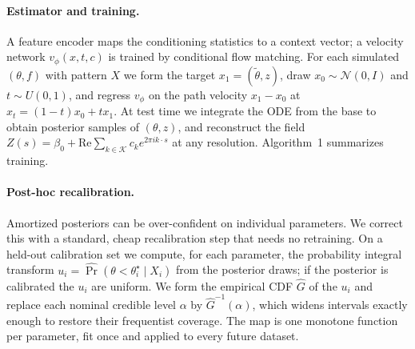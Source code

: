 \documentclass[10pt,twocolumn]{article}
\begin{document}
\paragraph{Estimator and training.}
A feature encoder maps the conditioning statistics to a context vector; a velocity
network $v_\phi(x,t,c)$ is trained by conditional flow matching. For each simulated
$(\theta,f)$ with pattern $X$ we form the target $x_1=(\tilde\theta,z)$, draw
$x_0\sim\mathcal{N}(0,I)$ and $t\sim U(0,1)$, and regress $v_\phi$ on the path
velocity $x_1-x_0$ at $x_t=(1-t)x_0+t x_1$. At test time we integrate the ODE from
the base to obtain posterior samples of $(\theta,z)$, and reconstruct the field
$Z(s)=\beta_0+\mathrm{Re}\sum_{k\in\mathcal{K}}c_k e^{2\pi i k\cdot s}$ at any
resolution. Algorithm~1 summarizes training.

\paragraph{Post-hoc recalibration.}
Amortized posteriors can be over-confident on individual parameters. We correct
this with a standard, cheap recalibration step that needs no retraining. On a
held-out calibration set we compute, for each parameter, the probability integral
transform $u_i=\widehat{\Pr}(\theta<\theta_i^\star\mid X_i)$ from the posterior
draws; if the posterior is calibrated the $u_i$ are uniform. We form the empirical
CDF $\widehat G$ of the $u_i$ and replace each nominal credible level $\alpha$ by
$\widehat G^{-1}(\alpha)$, which widens intervals exactly enough to restore their
frequentist coverage. The map is one monotone function per parameter, fit once and
applied to every future dataset.

\vspace{0.4em}
\noindent{}
\vspace{0.4em}
\end{document}
